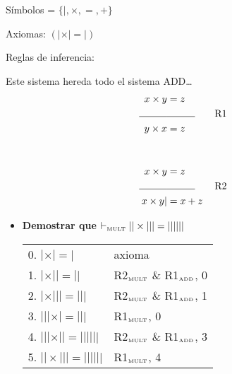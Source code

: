 \documentclass{article}
\begin{document}
\begin{itemize}
		Símbolos = $\{|, \times, =, +\}$

		Axiomas: $(| \times | = |)$

		Reglas de inferencia:

		Este sistema hereda todo el sistema ADD\dots
		\begin{alignat*}{2}
			x \times y                & = z                                 \\
			\makebox[1cm]{\hrulefill} & \makebox[1cm]{\hrulefill} \tag*{R1} \\
			y \times x                & = z                                 \\[1cm]
			x \times y                & = z                                 \\
			\makebox[1cm]{\hrulefill} & \makebox[1cm]{\hrulefill} \tag*{R2} \\
			x \times y|               & = x + z
		\end{alignat*}
		\begin{itemize}
			\item \textbf{Demostrar que} $\vdash_{\textrm{\tiny{MULT}}} || \times ||| = ||||||$
			      \begin{center}
				      \begin{NiceTabular}{l l}
					      0. $| \times | = |$         & axioma                                                       \\
					      1. $| \times || = ||$       & R2$_{\textrm{\tiny{MULT}}}$ \& R1$_{\textrm{\tiny{ADD}}}$, 0 \\
					      2. $| \times ||| = |||$     & R2$_{\textrm{\tiny{MULT}}}$ \& R1$_{\textrm{\tiny{ADD}}}$, 1 \\
					      3. $||| \times | = |||$     & R1$_{\textrm{\tiny{MULT}}}$, 0                               \\
					      4. $||| \times || = ||||||$ & R2$_{\textrm{\tiny{MULT}}}$ \& R1$_{\textrm{\tiny{ADD}}}$, 3 \\
					      5. $|| \times ||| = ||||||$ & R1$_{\textrm{\tiny{MULT}}}$, 4
				      \end{NiceTabular}
			      \end{center}
		\end{itemize}
\end{itemize}
\end{document}
